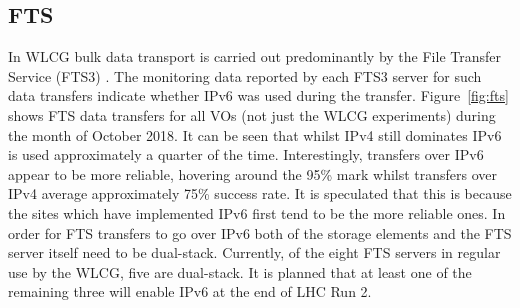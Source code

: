 \subsection{FTS}

In WLCG bulk data transport is carried out predominantly by the File Transfer Service (FTS3)  \cite{638647551}. The monitoring data reported by each FTS3 server for such data transfers indicate whether IPv6 was used during the transfer. Figure~\ref{fig:fts} shows FTS data transfers \cite{grafana-FTS} for all VOs (not just the WLCG experiments) during the month of October 2018. It can be seen that whilst IPv4 still dominates IPv6 is used approximately a quarter of the time. Interestingly, transfers over IPv6 appear to be more reliable, hovering around the 95\% mark whilst transfers over IPv4 average approximately 75\% success rate. It is speculated that this is because the sites which have implemented IPv6 first tend to be the more reliable ones. In order for FTS transfers to go over IPv6 both of the storage elements and the FTS server itself need to be dual-stack. Currently, of the eight FTS servers in regular use by the WLCG, five are dual-stack. It is planned that at least one of the remaining three will enable IPv6 at the end of LHC Run 2.


